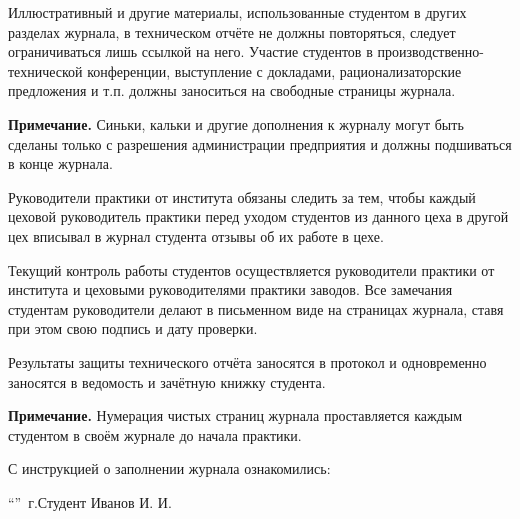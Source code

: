 \begin{multicols}{2}
{Иллюстративный и другие материалы, использованные студентом в других разделах журнала, в техническом отчёте не должны повторяться, следует ограничиваться лишь ссылкой на него. Участие студентов в производственно-технической конференции, выступление с докладами, рационализаторские предложения и т.п. должны заноситься на свободные страницы журнала.

{\bfseries Примечание.} Синьки, кальки и другие дополнения к журналу могут быть сделаны только с разрешения администрации предприятия и должны подшиваться в конце журнала.

Руководители практики от института обязаны следить за тем, чтобы каждый цеховой руководитель практики перед уходом студентов из данного цеха в другой цех вписывал в журнал студента отзывы об их работе в цехе.

Текущий контроль работы студентов осуществляется руководители практики от института и цеховыми руководителями практики заводов. Все замечания студентам руководители делают в письменном виде на страницах журнала, ставя при этом свою подпись и дату проверки.

Результаты защиты технического отчёта заносятся в протокол и одновременно заносятся в ведомость и зачётную книжку студента.

{\bfseries Примечание.} Нумерация чистых страниц журнала проставляется каждым студентом в своём журнале до начала практики.}
\end{multicols}

\begin{center}
С инструкцией о заполнении журнала ознакомились:
\end{center}

\enquote{\hspace{0.5cm}}  \the\year\,г.\hfill Студент Иванов И. И. 

\pagebreak
